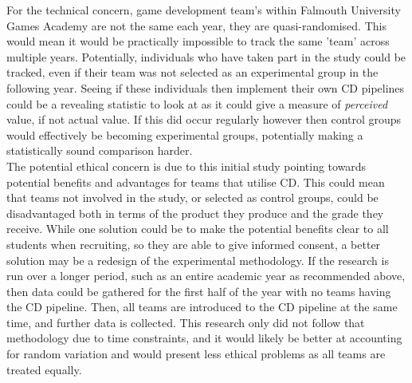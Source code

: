 \documentclass[journal]{IEEEtran}
\begin{document}
    For the technical concern, game development team's within Falmouth University Games Academy are not the same each year, they are quasi-randomised. This would mean it would be practically impossible to track the same 'team' across multiple years. Potentially, individuals who have taken part in the study could be tracked, even if their team was not selected as an experimental group in the following year. Seeing if these individuals then implement their own CD pipelines could be a revealing statistic to look at as it could give a measure of \textit{perceived} value, if not actual value. If this did occur regularly however then control groups would effectively be becoming experimental groups, potentially making a statistically sound comparison harder. \\
    The potential ethical concern is due to this initial study pointing towards potential benefits and advantages for teams that utilise CD. This could mean that teams not involved in the study, or selected as control groups, could be disadvantaged both in terms of the product they produce and the grade they receive. While one solution could be to make the potential benefits clear to all students when recruiting, so they are able to give informed consent, a better solution may be a redesign of the experimental methodology. If the research is run over a longer period, such as an entire academic year as recommended above, then data could be gathered for the first half of the year with no teams having the CD pipeline. Then, all teams are introduced to the CD pipeline at the same time, and further data is collected. This research only did not follow that methodology due to time constraints, and it would likely be better at accounting for random variation and would present less ethical problems as all teams are treated equally.

    
    
    
    
\end{document}
